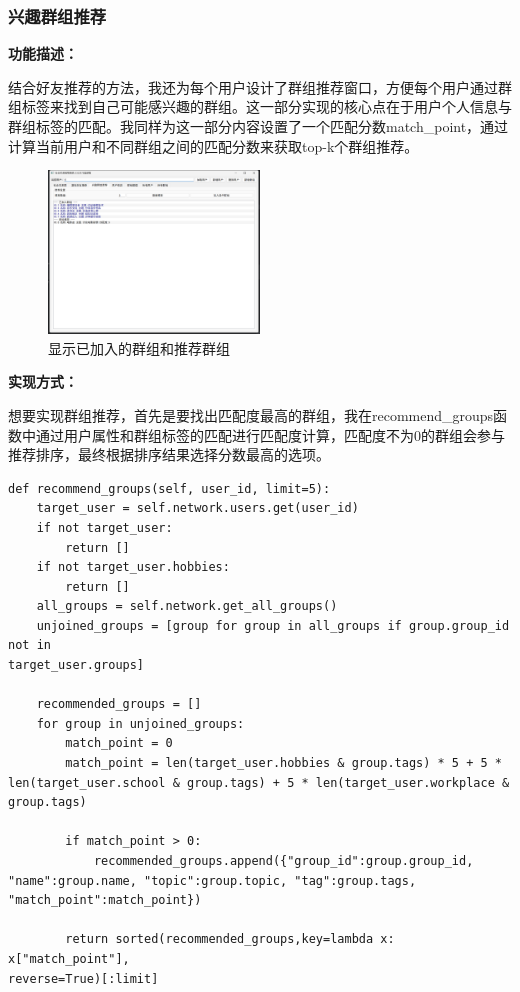 \documentclass[12pt,a4paper]{article}
\begin{document}
\subsubsection{兴趣群组推荐}

\noindent\textbf{功能描述：}

结合好友推荐的方法，我还为每个用户设计了群组推荐窗口，方便每个用户通过群组标签来找到自己可能感兴趣的群组。这一部分实现的核心点在于用户个人信息与群组标签的匹配。我同样为这一部分内容设置了一个匹配分数match\_point，通过计算当前用户和不同群组之间的匹配分数来获取top-k个群组推荐。

\begin{figure}[H]
    \centering
    \includegraphics[width=0.5\textwidth]{pt2-4.png}
    \caption{显示已加入的群组和推荐群组}
\end{figure}

\noindent\textbf{实现方式：}

想要实现群组推荐，首先是要找出匹配度最高的群组，我在recommend\_groups函数中通过用户属性和群组标签的匹配进行匹配度计算，匹配度不为0的群组会参与推荐排序，最终根据排序结果选择分数最高的选项。

\small\begin{verbatim}
def recommend_groups(self, user_id, limit=5):
    target_user = self.network.users.get(user_id)
    if not target_user:
        return []
    if not target_user.hobbies:
        return []
    all_groups = self.network.get_all_groups()
    unjoined_groups = [group for group in all_groups if group.group_id not in 
target_user.groups]

    recommended_groups = []
    for group in unjoined_groups:
        match_point = 0
        match_point = len(target_user.hobbies & group.tags) * 5 + 5 * 
len(target_user.school & group.tags) + 5 * len(target_user.workplace & group.tags)
            
        if match_point > 0:
            recommended_groups.append({"group_id":group.group_id, 
"name":group.name, "topic":group.topic, "tag":group.tags, "match_point":match_point})
        
        return sorted(recommended_groups,key=lambda x: x["match_point"], 
reverse=True)[:limit]
\end{verbatim}
\end{document}
